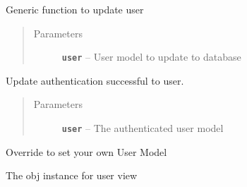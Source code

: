 \documentclass[letterpaper,10pt,english]{sphinxmanual}
\begin{document}
\begin{fulllineitems}
\begin{fulllineitems}
\label{api:flask.ext.appbuilder.security.manager.BaseSecurityManager.update_user}
Generic function to update user
\begin{quote}\begin{description}
\item[{Parameters}] \leavevmode
\textbf{\texttt{user}} -- User model to update to database

\end{description}\end{quote}

\end{fulllineitems}


\begin{fulllineitems}
\label{api:flask.ext.appbuilder.security.manager.BaseSecurityManager.update_user_auth_stat}
Update authentication successful to user.
\begin{quote}\begin{description}
\item[{Parameters}] \leavevmode
\textbf{\texttt{user}} -- The authenticated user model

\end{description}\end{quote}

\end{fulllineitems}


\begin{fulllineitems}
\label{api:flask.ext.appbuilder.security.manager.BaseSecurityManager.user_model}
Override to set your own User Model

\end{fulllineitems}


\begin{fulllineitems}
\label{api:flask.ext.appbuilder.security.manager.BaseSecurityManager.user_view}
The obj instance for user view


\end{fulllineitems}
\end{fulllineitems}
\end{document}
